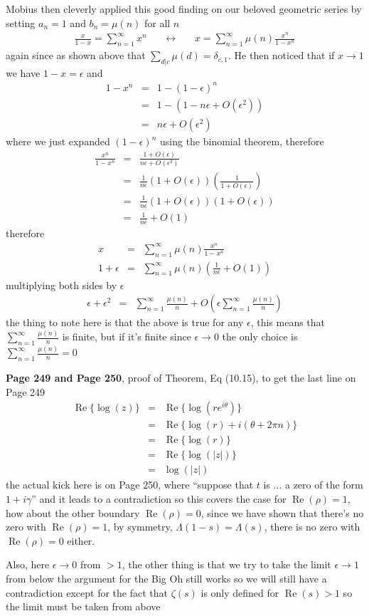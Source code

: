 \documentclass[aps,preprint,preprintnumbers,nofootinbib,showpacs,prd]{revtex4-1}
\newcommand{\nbea}{\begin{eqnarray*}}
\newcommand{\neea}{\end{eqnarray*}}
\DeclareMathOperator{\re}{Re}
\begin{document}
Mobius then cleverly applied this good finding on our beloved geometric series by setting $a_n=1$ and $b_n=\mu(n)$ for all $n$
%
\nbea
\frac{x}{1-x} = \sum_{n=1}^\infty x^n &~~~~~\longleftrightarrow~~~~~& x = \sum_{n=1}^\infty \mu(n) \frac{x^n}{1-x^n}
\neea
%
again since as shown above that $\sum_{d|c}\mu(d) = \delta_{c,1}$. He then noticed that if $x\to1$ we have $1-x = \epsilon$ and
%
\nbea
1-x^n & = & 1- (1-\epsilon)^n \\
& = & 1 - ( 1 - n\epsilon + O(\epsilon^2) ) \\
& = & n\epsilon + O(\epsilon^2)
\neea
%
where we just expanded $(1-\epsilon)^n$ using the binomial theorem, therefore
%
\nbea
\frac{x^n}{1-x^n} & = & \frac{1 + O(\epsilon)}{n\epsilon + O(\epsilon^2)} \\
& = & \frac{1}{n\epsilon}(1+O(\epsilon))\left(\frac{1}{1 + O(\epsilon)}\right) \\
& = & \frac{1}{n\epsilon}(1+O(\epsilon))\left(1 + O(\epsilon)\right) \\
& = & \frac{1}{n\epsilon}+O(1)
\neea
%
therefore
%
\nbea
x & = & \sum_{n=1}^\infty \mu(n) \frac{x^n}{1-x^n} \\
1 + \epsilon & = & \sum_{n=1}^\infty \mu(n) \left(\frac{1}{n\epsilon}+O(1) \right)
\neea
%
multiplying both sides by $\epsilon$
%
\nbea
\epsilon + \epsilon^2 & = & \sum_{n=1}^\infty \frac{\mu(n)}{n}+O\left(\epsilon\sum_{n=1}^\infty \frac{\mu(n)}{n}\right)
\neea
%
the thing to note here is that the above is true for any $\epsilon$, this means that $\sum_{n=1}^\infty \frac{\mu(n)}{n}$ is finite, but if it's finite since $\epsilon\to0$ the only choice is $\sum_{n=1}^\infty \frac{\mu(n)}{n} = 0$

{\bf Page 249 and Page 250}, proof of Theorem, Eq (10.15), to get the last line on Page 249
%
\nbea
\re\{\log(z)\} & = & \re \{\log(r e^{i\theta})\} \\
& = & \re\{\log(r) + i(\theta + 2\pi n)\} \\
& = & \re\{\log(r)\} \\
& = & \re\{\log(|z|)\} \\
& = & \log(|z|)
\neea
%
the actual kick here is on Page 250, where ``suppose that $t$ is $\ldots$ a zero of the form $1+i\gamma$'' and it leads to a contradiction so this covers the case for $\re(\rho) = 1$, how about the other boundary $\re(\rho) = 0$, since we have shown that there's no zero with $\re(\rho) = 1$, by symmetry, $\Lambda(1-s) = \Lambda(s)$, there is no zero with $\re(\rho)=0$ either.

Also, here $\epsilon\to0$ from $> 1$, the other thing is that we try to take the limit $\epsilon\to1$ from below the argument for the Big Oh still works so we will still have a contradiction except for the fact that $\zeta(s)$ is only defined for $\re(s) > 1$ so the limit must be taken from above
\end{document}
